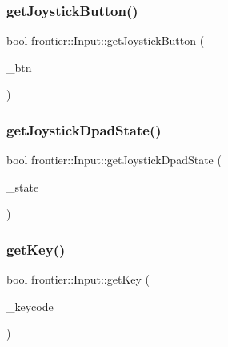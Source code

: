 \subsubsection{\texorpdfstring{get\+Joystick\+Button()}{getJoystickButton()}}
{\footnotesize\ttfamily bool frontier\+::\+Input\+::get\+Joystick\+Button (\begin{DoxyParamCaption}\item[{\hyperlink{classfrontier_1_1_input_affa0331a173268233d6630184a105bb6}{Controller\+Buttons}}]{\+\_\+btn }\end{DoxyParamCaption})}

\mbox{\label{classfrontier_1_1_input_a8a4efb296d3f78e8eea6064da50af43b}} 
\subsubsection{\texorpdfstring{get\+Joystick\+Dpad\+State()}{getJoystickDpadState()}}
{\footnotesize\ttfamily bool frontier\+::\+Input\+::get\+Joystick\+Dpad\+State (\begin{DoxyParamCaption}\item[{\hyperlink{classfrontier_1_1_input_a53a85fe24f5b35e1a42ab370dcd0d94e}{Dpad\+States}}]{\+\_\+state }\end{DoxyParamCaption})}

\mbox{\label{classfrontier_1_1_input_a9db590e5a79e86162f930f9d80cd70a3}} 
\subsubsection{\texorpdfstring{get\+Key()}{getKey()}}
{\footnotesize\ttfamily bool frontier\+::\+Input\+::get\+Key (\begin{DoxyParamCaption}\item[{\hyperlink{classfrontier_1_1_input_ada5b6b09af9c827bacee6fbc69015096}{Listed\+Buttons}}]{\+\_\+keycode }\end{DoxyParamCaption})}

\mbox{\label{classfrontier_1_1_input_ab0f4c13a20e12f8679666fb6e4f4ccaf}} 
